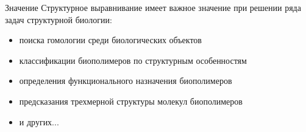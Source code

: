 \documentclass[utf8, professionalfonts]{beamer}
\begin{document}
\begin{frame}{Значение}
Структурное выравнивание имеет важное значение при решении ряда задач структурной биологии:
\begin{itemize}
    \item поиска гомологии среди биологических объектов
    \item классификации биополимеров по структурным особенностям
    \item определения функционального назначения биополимеров
    \item предсказания трехмерной структуры молекул биополимеров 
    \item и других...
\end{itemize}

\end{frame}
\end{document}
